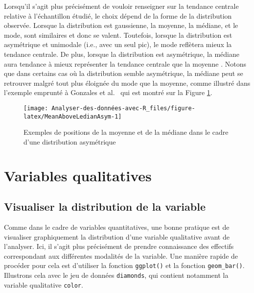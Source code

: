 \documentclass[
  french,
]{book}
\begin{document}
Lorsqu'il s'agit plus précisément de vouloir renseigner sur la tendance centrale relative à l'échantillon étudié, le choix dépend de la forme de la distribution observée. Lorsque la distribution est gaussienne, la moyenne, la médiane, et le mode, sont similaires et donc se valent. Toutefois, lorsque la distribution est asymétrique et unimodale (i.e., avec un seul pic), le mode reflètera mieux la tendance centrale. De plus, lorsque la distribution est asymétrique, la médiane aura tendance à mieux représenter la tendance centrale que la moyenne \autocite{rousseletReactionTimesOther2020}. Notons que dans certains cas où la distribution semble asymétrique, la médiane peut se retrouver malgré tout plus éloignée du mode que la moyenne, comme illustré dans l'exemple emprunté à Gonzales et al.~\autocite*{gonzalesMeasuresCentralTendency2001} qui est montré sur la Figure \ref{fig:MeanAboveLedianAsym}.

\begin{figure}

{\centering \texttt{[image: Analyser-des-données-avec-R\_files/figure-latex/MeanAboveLedianAsym-1]} 

}

\caption{Exemples de positions de la moyenne et de la médiane dans le cadre d'une distribution asymétrique}\label{fig:MeanAboveLedianAsym}
\end{figure}

\hypertarget{variables-qualitatives}{%
\section{Variables qualitatives}\label{variables-qualitatives}}

\hypertarget{visualiser-la-distribution-de-la-variable-1}{%
\subsection{Visualiser la distribution de la variable}\label{visualiser-la-distribution-de-la-variable-1}}

Comme dans le cadre de variables quantitatives, une bonne pratique est de visualiser graphiquement la distribution d'une variable qualitative avant de l'analyser. Ici, il s'agit plus précisément de prendre connaissance des effectifs correspondant aux différentes modalités de la variable. Une manière rapide de procéder pour cela est d'utiliser la fonction \texttt{ggplot()} et la fonction \texttt{geom\_bar()}. Illustrons cela avec le jeu de données \texttt{diamonds}, qui contient notamment la variable qualitative \texttt{color}.
\end{document}

